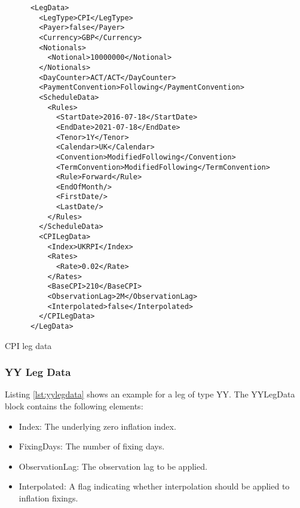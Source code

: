 \begin{listing}[H]
\begin{verbatim}
      <LegData>
        <LegType>CPI</LegType>
        <Payer>false</Payer>
        <Currency>GBP</Currency>
        <Notionals>
          <Notional>10000000</Notional>
        </Notionals>
        <DayCounter>ACT/ACT</DayCounter>
        <PaymentConvention>Following</PaymentConvention>
        <ScheduleData>
          <Rules>
            <StartDate>2016-07-18</StartDate>
            <EndDate>2021-07-18</EndDate>
            <Tenor>1Y</Tenor>
            <Calendar>UK</Calendar>
            <Convention>ModifiedFollowing</Convention>
            <TermConvention>ModifiedFollowing</TermConvention>
            <Rule>Forward</Rule>
            <EndOfMonth/>
            <FirstDate/>
            <LastDate/>
          </Rules>
        </ScheduleData>
        <CPILegData>
          <Index>UKRPI</Index>
          <Rates>
            <Rate>0.02</Rate>
          </Rates>
          <BaseCPI>210</BaseCPI>
          <ObservationLag>2M</ObservationLag>
          <Interpolated>false</Interpolated>
        </CPILegData>
      </LegData>
\end{verbatim}
\caption{CPI leg data}
\label{lst:cpilegdata}
\end{listing}

\subsubsection{YY Leg Data}
\label{ss:yylegdata}

Listing \ref{lst:yylegdata} shows an example for a leg of type YY. The YYLegData block contains the following
elements:

\begin{itemize}
\item Index: The underlying zero inflation index.
\item FixingDays: The number of fixing days.
\item ObservationLag: The observation lag to be applied.
\item Interpolated: A flag indicating whether interpolation should be applied to inflation fixings.
\end{itemize}

